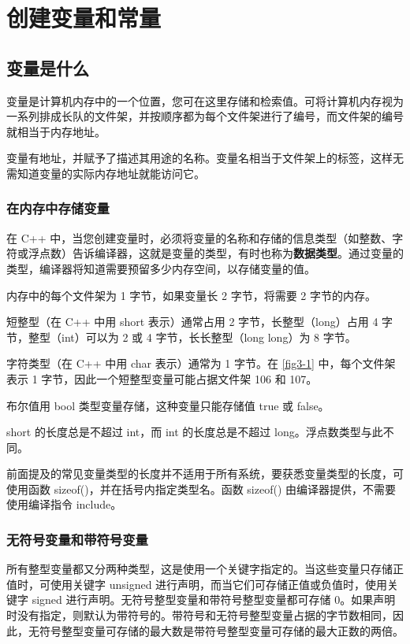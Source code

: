 \chapter{创建变量和常量}
\section{变量是什么}
变量是计算机内存中的一个位置，您可在这里存储和检索值。可将计算机内存视为一系列排成长队的文件架，并按顺序都为每个文件架进行了编号，而文件架的编号就相当于内存地址。

变量有地址，并赋予了描述其用途的名称。变量名相当于文件架上的标签，这样无需知道变量的实际内存地址就能访问它。

\subsection*{在内存中存储变量}
在 C++ 中，当您创建变量时，必须将变量的名称和存储的信息类型（如整数、字符或浮点数）告诉编译器，这就是变量的类型，有时也称为\textbf{数据类型}。通过变量的类型，编译器将知道需要预留多少内存空间，以存储变量的值。

内存中的每个文件架为 1 字节，如果变量长 2 字节，将需要 2 字节的内存。

短整型（在 C++ 中用 short 表示）通常占用 2 字节，长整型（long）占用 4 字节，整型（int）可以为 2 或 4 字节，长长整型（long long）为 8 字节。

字符类型（在 C++ 中用 char 表示）通常为 1 字节。在 \autoref{fig3-1} 中，每个文件架表示 1 字节，因此一个短整型变量可能占据文件架 106 和 107。

布尔值用 bool 类型变量存储，这种变量只能存储值 true 或 false。

short 的长度总是不超过 int，而 int 的长度总是不超过 long。浮点数类型与此不同。

前面提及的常见变量类型的长度并不适用于所有系统，要获悉变量类型的长度，可使用函数 sizeof()，并在括号内指定类型名。函数 sizeof() 由编译器提供，不需要使用编译指令 include。
\subsection*{无符号变量和带符号变量}
所有整型变量都又分两种类型，这是使用一个关键字指定的。当这些变量只存储正值时，可使用关键字 unsigned 进行声明，而当它们可存储正值或负值时，使用关键字 signed 进行声明。无符号整型变量和带符号整型变量都可存储 0。如果声明时没有指定，则默认为带符号的。带符号和无符号整型变量占据的字节数相同，因此，无符号整型变量可存储的最大数是带符号整型变量可存储的最大正数的两倍。
